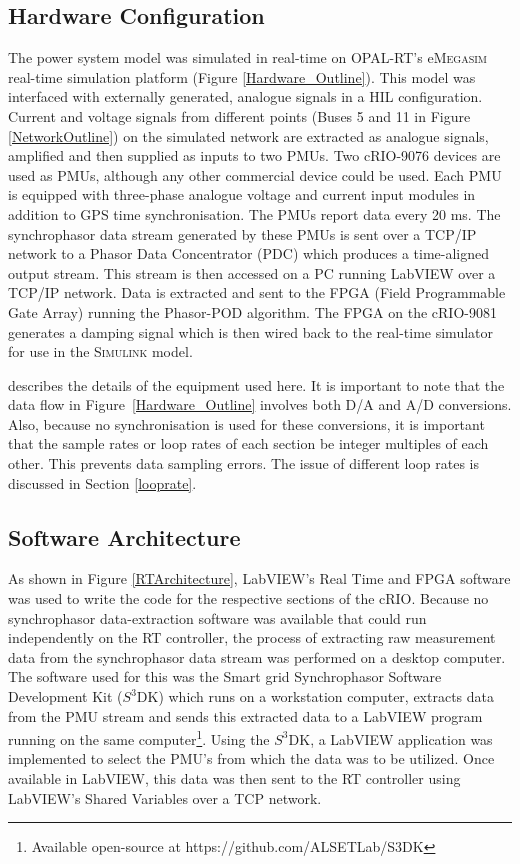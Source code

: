 \documentclass{ieeeaccess}
\begin{document}
\subsection{Hardware Configuration}
The power system model was simulated in real-time on OPAL-RT's e\textsc{Megasim} \cite{eMEGASIM} real-time simulation platform (Figure \ref {Hardware_Outline}). This model was interfaced with externally generated, analogue signals in a HIL configuration. Current and voltage signals from different points (Buses 5 and 11 in Figure \ref{NetworkOutline}) on the simulated network are extracted as analogue signals, amplified and then supplied as inputs to two PMUs. Two cRIO-9076 \cite{cRIO9081} devices are used as PMUs, although any other commercial device could be used. Each PMU is equipped with three-phase analogue voltage and current input modules in addition to GPS time synchronisation. The PMUs report data every 20 ms. The synchrophasor data stream  generated by these PMUs is sent over a TCP/IP network to a Phasor Data Concentrator (PDC) which produces a time-aligned output stream. This stream is then accessed on a PC running LabVIEW over a TCP/IP network. Data is extracted and sent to the FPGA (Field Programmable Gate Array) running the Phasor-POD algorithm. The FPGA on the cRIO-9081 \cite{cRIO9081} generates a damping signal which is then wired back to the real-time simulator for use in the \textsc{Simulink} model.

\cite{PhasorPODImplement} describes the details of the equipment used here. It is important to note that the data flow in Figure~\ref{Hardware_Outline} involves both D/A and A/D conversions. Also, because no synchronisation is used for these conversions, it is important that the sample rates or loop rates of each section be integer multiples of each other. This prevents data sampling errors. The issue of different loop rates is discussed in Section \ref{looprate}.

\subsection{Software Architecture}

As shown in Figure \ref{RTArchitecture}, LabVIEW's Real Time and FPGA software was used to write the code for the respective sections of the cRIO. Because no synchrophasor data-extraction software was available that could run independently on the RT controller, the process of extracting raw measurement data from the synchrophasor data stream was performed on a desktop computer. The software used for this was the Smart grid Synchrophasor Software Development Kit ($S^{3}$DK) which runs on a workstation computer, extracts data from the PMU stream and sends this extracted data to a LabVIEW program running on the same computer\footnote{Available open-source at https://github.com/ALSETLab/S3DK}. Using the $S^{3}$DK, a LabVIEW application was implemented to select the PMU\rq{s} from which the data was to be utilized. Once available in LabVIEW, this data was then sent to the RT controller using LabVIEW\rq{s} Shared Variables \cite{LabViewManuals} over a TCP network.
\end{document}
